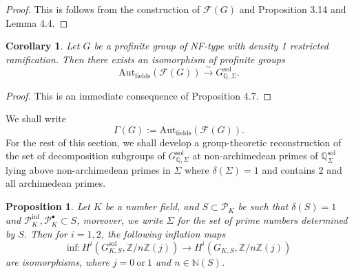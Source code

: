\documentclass{article}
\theoremstyle{plain}
\newtheorem{prop}[thm]{Proposition}
\newtheorem{cor}[thm]{Corollary}
\theoremstyle{definition}
\theoremstyle{remark}
\begin{document}
\begin{proof}
This is follows from the construction of $\mathcal{F}(G)$ and Proposition 3.14 and Lemma 4.4.
\end{proof}
\begin{cor}
Let $G$ be a profinite group of NF-type with density 1 restricted ramification. Then there exists an isomorphism of profinite groups
$$
\text{Aut}_{\text{fields}}(\mathcal{F}(G)) \xrightarrow{\sim} G_{\mathbb Q,\Sigma}^{\text{sol}}.
$$
\end{cor}
\begin{proof}
This is an immediate consequence of Proposition 4.7.
\end{proof}
We shall write
$$
\Gamma(G) := \text{Aut}_{\text{fields}}(\mathcal{F}(G)).
$$
For the rest of this section, we shall develop a group-theoretic reconstruction of the set of decomposition subgroups of $G_{\mathbb Q,\Sigma}^{\text{sol}}$ at non-archimedean primes of $\mathbb Q^{\text{sol}}_{\Sigma}$ lying above non-archimedean primes in $\Sigma$ where $\delta(\Sigma) = 1$ and contains $2$ and all archimedean primes.
\begin{prop}
Let $K$ be a number field, and $S \subset \mathscr{P}_K$ be such that $\delta(S) = 1$ and $\mathscr{P}_K^{\text{inf}},\mathscr{P}_K^{\bullet} \subset S$, moreover, we write $\Sigma$ for the set of prime numbers determined by $S$. Then for $i = 1,2$, the following inflation maps
$$
\text{inf}:H^i(G_{K,S}^{\text{sol}},\mathbb Z/n\mathbb Z(j)) \to H^i(G_{K,S},\mathbb Z/n\mathbb Z(j))
$$
are isomorphisms, where $j = 0 ~\text{or} ~1$ and $n \in \mathbb N(S)$.
\end{prop}
\end{document}
